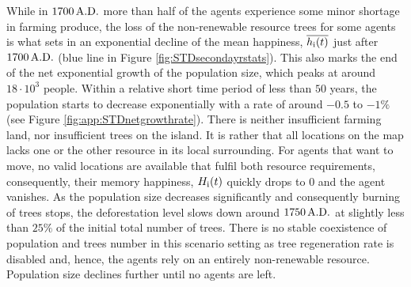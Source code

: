 While in $1700\,{\rm A.D.}$ more than half of the agents experience some minor shortage in farming produce, the loss of the non-renewable resource trees for some agents is what sets in an exponential decline of the mean happiness, $\overline{h_{\rm i}(t)}$ just after $1700\, {\rm A.D.}$ (blue line in Figure \ref{fig:STDsecondayrstats}).
This also marks the end of the net exponential growth of the population size, which peaks at around $18\cdot 10^3$ people.
Within a relative short time period of less than $50$ years, the population starts to decrease exponentially with a rate of around $-0.5$ to $-1\%$ (see Figure \ref{fig:app:STDnetgrowthrate}).
There is neither insufficient farming land, nor insufficient trees on the island.
It is rather that all locations on the map lacks one or the other resource in its local surrounding.
For agents that want to move, no valid locations are available that fulfil both resource requirements, consequently, their memory happiness, $H_{\rm i}(t)$ quickly drops to $0$ and the agent vanishes.
As the population size decreases significantly and consequently burning of trees stops, the deforestation level slows down around $1750\, {\rm A.D.}$ at slightly less than $25\%$ of the initial total number of trees. 
There is no stable coexistence of population and trees number in this scenario setting as tree regeneration rate is disabled and, hence, the agents rely on an entirely non-renewable resource.
Population size declines further until no agents are left.






